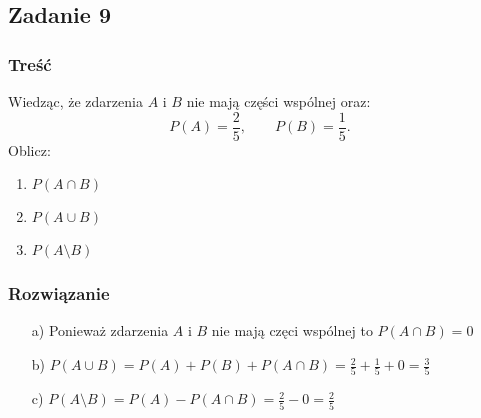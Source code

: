 \subsection{Zadanie 9}

\subsubsection*{Treść}
Wiedząc, że zdarzenia $A$ i $B$ nie mają części wspólnej oraz:
$$
P(A) = \frac{2}{5}, \quad \quad P(B) = \frac{1}{5}.
$$ 
Oblicz:
\begin{enumerate}[label=\alph*)] 
  \item $P(A \cap B)$
  \item $P(A \cup B)$
  \item $P(A \setminus B)$
\end{enumerate} 

\subsubsection*{Rozwiązanie}
\begin{itemize}
\item[a)] Ponieważ zdarzenia $A$ i $B$ nie mają częci wspólnej to $P(A \cap B) = 0$
\item[b)]$ P(A \cup B) = P(A) + P(B) + P(A \cap B) = \frac{2}{5} + \frac{1}{5} + 0 = \frac{3}{5}$
\item[c)] $P(A \setminus B) = P(A) - P(A \cap B) = \frac{2}{5} - 0 = \frac{2}{5}$
\end{itemize}

